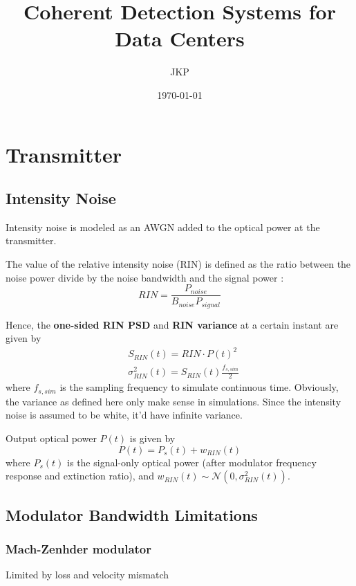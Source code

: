 \documentclass[a4paper]{article}
\title{Coherent Detection Systems for Data Centers}
\author{JKP}
\date{\today}
\begin{document}
\maketitle

\section{Transmitter}
\subsection{Intensity Noise}
Intensity noise is modeled as an AWGN added to the optical power at the transmitter.

The value of the relative intensity noise (RIN) is defined as the ratio between the noise power divide by the noise bandwidth and the signal power \cite{agilent-RIN-measurement}: 
\begin{equation}
RIN = \frac{P_{noise}}{B_{noise}P_{signal}}
\end{equation}

Hence, the \textbf{one-sided RIN PSD} and \textbf{RIN variance} at a certain instant are given by
\begin{align}
& S_{RIN}(t) = RIN\cdot P(t)^2 \\
& \sigma^2_{RIN}(t) = S_{RIN}(t)\frac{f_{s, sim}}{2}
\end{align}
where $f_{s, sim}$ is the sampling frequency to simulate continuous time. Obviously, the variance as defined here only make sense in simulations. Since the intensity noise is assumed to be white, it'd have infinite variance.

Output optical power $P(t)$ is given by
\begin{equation}
P(t) = P_s(t) + w_{RIN}(t)
\end{equation}
where $P_s(t)$ is the signal-only optical power (after modulator frequency response and extinction ratio), and $w_{RIN}(t)\sim\mathcal{N}(0, \sigma^2_{RIN}(t))$.

\subsection{Modulator Bandwidth Limitations}

\subsubsection{Mach-Zenhder modulator}
\cite{Barros2009, Ho2005}

Limited by loss and velocity mismatch
\end{document}
